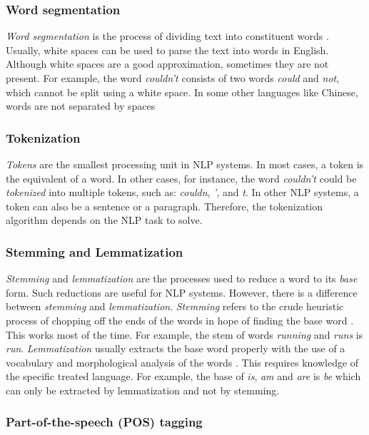 \subsubsection{Word segmentation}

\textit{Word segmentation} is the process of dividing text into constituent words \cite{wiki:sentSeg}. Usually, white spaces can be used to parse the text into words in English. Although white spaces are a good approximation, sometimes they are not present. For example, the word \textit{couldn't} consists of two words \textit{could} and \textit{not}, which cannot be split using a white space. In some other languages like Chinese, words are not separated by spaces

\subsubsection{Tokenization}

\textit{Tokens} are the smallest processing unit in NLP systems. In most cases, a token is the equivalent of a word. In other cases, for instance, the word \textit{couldn't} could be \emph{tokenized} into multiple tokens, such as: \textit{couldn}, \textit{'}, and \textit{t}. In other NLP systems, a token can also be a sentence or a paragraph. Therefore, the tokenization algorithm depends on the NLP task to solve.

\subsubsection{Stemming and Lemmatization}

\textit{Stemming} and \textit{lemmatization} are the processes used to reduce a word to its \textit{base} form. Such reductions are useful for NLP systems. However, there is a difference between \textit{stemming} and \textit{lemmatization}. \textit{Stemming} refers to the crude heuristic process of chopping off the ends of the words in hope of finding the base word \cite{stemminglemmatization}. This works most of the time. For example, the stem of words \textit{running} and \textit{runs} is \textit{run}. \textit{Lemmatization} usually extracts the base word properly with the use of a vocabulary and morphological analysis of the words \cite{stemminglemmatization}.  This requires knowledge of the specific treated language. For example, the base of \textit{is}, \textit{am} and \textit{are} is \textit{be} which can only be extracted by lemmatization and not by stemming.

\subsubsection{Part-of-the-speech (POS) tagging}

